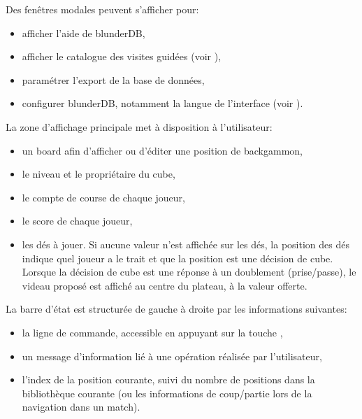 \documentclass[letterpaper,10pt,french]{sphinxmanual}
\begin{document}
\sphinxAtStartPar
Des fenêtres modales peuvent s’afficher pour:
\begin{itemize}
\item {} 
\sphinxAtStartPar
afficher l’aide de blunderDB,

\item {} 
\sphinxAtStartPar
afficher le catalogue des visites guidées (voir {\hyperref[\detokenize{manuel:visites-guidees}]{}}),

\item {} 
\sphinxAtStartPar
paramétrer l’export de la base de données,

\item {} 
\sphinxAtStartPar
configurer blunderDB, notamment la langue de l’interface (voir
{\hyperref[\detokenize{manuel:configuration}]{}}).

\end{itemize}

\sphinxAtStartPar
La zone d’affichage principale met à disposition à l’utilisateur:
\begin{itemize}
\item {} 
\sphinxAtStartPar
un board afin d’afficher ou d’éditer une position de backgammon,

\item {} 
\sphinxAtStartPar
le niveau et le propriétaire du cube,

\item {} 
\sphinxAtStartPar
le compte de course de chaque joueur,

\item {} 
\sphinxAtStartPar
le score de chaque joueur,

\item {} 
\sphinxAtStartPar
les dés à jouer. Si aucune valeur n’est affichée sur les dés, la
position des dés indique quel joueur a le trait et que la position est
une décision de cube. Lorsque la décision de cube est une réponse à un
doublement (prise/passe), le videau proposé est affiché au centre du
plateau, à la valeur offerte.

\end{itemize}

\sphinxAtStartPar
La barre d’état est structurée de gauche à droite par les informations
suivantes:
\begin{itemize}
\item {} 
\sphinxAtStartPar
la ligne de commande, accessible en appuyant sur la touche ,

\item {} 
\sphinxAtStartPar
un message d’information lié à une opération réalisée par l’utilisateur,

\item {} 
\sphinxAtStartPar
l’index de la position courante, suivi du nombre de positions dans la
bibliothèque courante (ou les informations de coup/partie lors de la
navigation dans un match).

\end{itemize}
\end{document}
